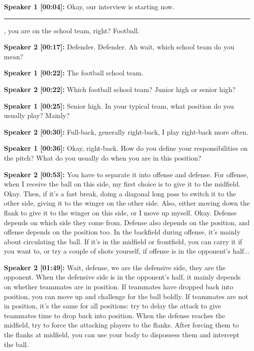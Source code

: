 \documentclass[11pt,a4paper]{article}
\newcommand{\redacted}{\rule{2.5cm}{2ex}}
\begin{document}
\begin{linenumbers}

\noindent \textbf{Speaker 1 [00:04]:} Okay, our interview is starting now. \redacted, you are on the school team, right? Football.

\vspace{0.5em}
\noindent \textbf{Speaker 2 [00:17]:} Defender. Defender. Ah wait, which school team do you mean?

\vspace{0.5em}
\noindent \textbf{Speaker 1 [00:22]:} The football school team.

\vspace{0.5em}
\noindent \textbf{Speaker 2 [00:22]:} Which football school team? Junior high or senior high?

\vspace{0.5em}
\noindent \textbf{Speaker 1 [00:25]:} Senior high. In your typical team, what position do you usually play? Mainly?

\vspace{0.5em}
\noindent \textbf{Speaker 2 [00:30]:} Full-back, generally right-back, I play right-back more often.

\vspace{0.5em}
\noindent \textbf{Speaker 1 [00:36]:} Okay, right-back. How do you define your responsibilities on the pitch? What do you usually do when you are in this position?

\vspace{0.5em}
\noindent \textbf{Speaker 2 [00:53]:} You have to separate it into offense and defense. For offense, when I receive the ball on this side, my first choice is to give it to the midfield. Okay. Then, if it's a fast break, doing a diagonal long pass to switch it to the other side, giving it to the winger on the other side. Also, either moving down the flank to give it to the winger on this side, or I move up myself. Okay. Defense depends on which side they come from. Defense also depends on the position, and offense depends on the position too. In the backfield during offense, it's mainly about circulating the ball. If it's in the midfield or frontfield, you can carry it if you want to, or try a couple of shots yourself, if offense is in the opponent's half...

\vspace{0.5em}
\noindent \textbf{Speaker 2 [01:49]:} Wait, defense, we are the defensive side, they are the opponent. When the defensive side is in the opponent's half, it mainly depends on whether teammates are in position. If teammates have dropped back into position, you can move up and challenge for the ball boldly. If teammates are not in position, it's the same for all positions: try to delay the attack to give teammates time to drop back into position. When the defense reaches the midfield, try to force the attacking players to the flanks. After forcing them to the flanks at midfield, you can use your body to dispossess them and intercept the ball.


\end{linenumbers}
\end{document}
